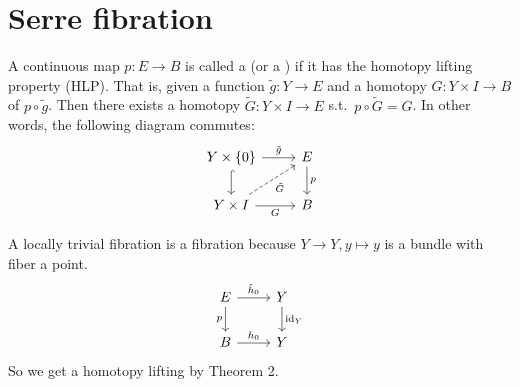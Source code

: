\documentclass[12pt,class=article,crop=false]{standalone}
\begin{document}
\section{Serre fibration}
\begin{defn}
A continuous map $ p: E \to B$ is called a  (or a ) if it has the homotopy lifting property (HLP). That is, given a function $ \widetilde{ g}: Y \to E$ and a homotopy $ G: Y \times I \to B$ of $ p \circ \widetilde{ g}$. Then there exists a homotopy $ \widetilde{ G}: Y \times I \to E$ s.t.\ $ p \circ \widetilde{ G} = G$. In other words, the following diagram commutes:
\[\begin{tikzcd}
	{Y \times \{0\}} & E \\
	{Y \times I} & B
	\arrow["p", from=1-2, to=2-2]
	\arrow["{\tilde{G}}"', dashed, from=2-1, to=1-2]
	\arrow["G"', from=2-1, to=2-2]
	\arrow["{\tilde{g}}", from=1-1, to=1-2]
	\arrow[hook, from=1-1, to=2-1]
\end{tikzcd}\]  
\end{defn}
\begin{remark}
A locally trivial fibration is a fibration because $ Y \to Y, y\mapsto y$ is a bundle with fiber a point.
\[\begin{tikzcd}
	E & Y \\
	B & Y
	\arrow["{\tilde{h}_0}", from=1-1, to=1-2]
	\arrow["{\text{id}_Y}", from=1-2, to=2-2]
	\arrow["p"', from=1-1, to=2-1]
	\arrow["{h_0}", from=2-1, to=2-2]
\end{tikzcd}\]
So we get a homotopy lifting by Theorem 2.
\end{remark}
\end{document}
